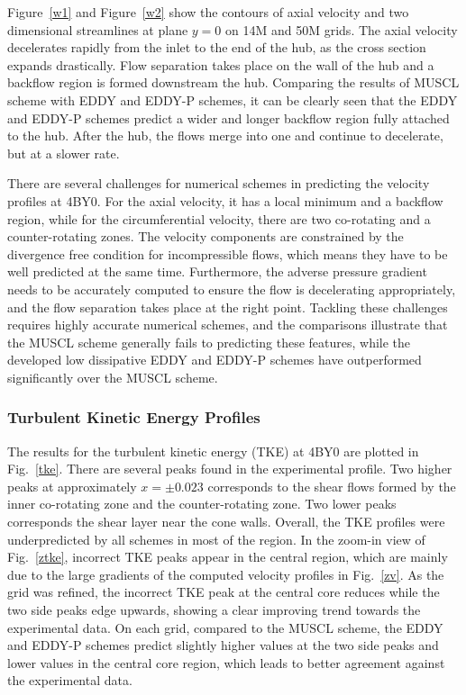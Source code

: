 Figure~\ref{w1} and Figure~\ref{w2} show the contours of axial velocity and two dimensional streamlines at plane $y=0$ on 14M and 50M grids. The axial velocity decelerates rapidly from the inlet to the end of the hub, as the cross section expands drastically. Flow separation takes place on the wall of the hub and a backflow region is formed downstream the hub. Comparing the results of MUSCL scheme with EDDY and EDDY-P schemes, it can be clearly seen that the EDDY and EDDY-P schemes predict a wider and longer backflow region fully attached to the hub. After the hub, the flows merge into one and continue to decelerate, but at a slower rate.

There are several challenges for numerical schemes in predicting the velocity profiles at 4BY0. For the axial velocity, it has a local minimum and a backflow region, while for the circumferential velocity, there are two co-rotating and a counter-rotating zones. The velocity components are constrained by the divergence free condition for incompressible flows, which means they have to be well predicted at the same time. Furthermore, the adverse pressure gradient needs to be accurately computed to ensure the flow is decelerating appropriately, and the flow separation takes place at the right point. Tackling these challenges requires highly accurate numerical schemes, and the comparisons illustrate that the MUSCL scheme generally fails to predicting these features, while the developed low dissipative EDDY and EDDY-P schemes have outperformed significantly over the MUSCL scheme.
\subsubsection{Turbulent Kinetic Energy Profiles}
The results for the turbulent kinetic energy (TKE)  at 4BY0 are plotted in Fig.~\ref{tke}. There are several peaks found in the experimental profile. Two higher peaks at approximately $x=\pm 0.023$ corresponds to the shear flows formed by the inner co-rotating zone and the counter-rotating zone. Two lower peaks corresponds the shear layer near the cone walls. Overall, the TKE profiles were underpredicted by all schemes in most of the region. In the zoom-in view of Fig.~\ref{ztke}, incorrect TKE peaks appear in the central region, which are mainly due to the large gradients of the computed velocity profiles in Fig.~\ref{zv}. As the grid was refined, the incorrect TKE peak at the central core reduces while the two side peaks edge upwards, showing a clear improving trend towards the experimental data. On each grid, compared to the MUSCL scheme, the EDDY and EDDY-P schemes predict slightly higher values at the two side peaks and lower values in the central core region, which leads to better agreement against the experimental data. 
